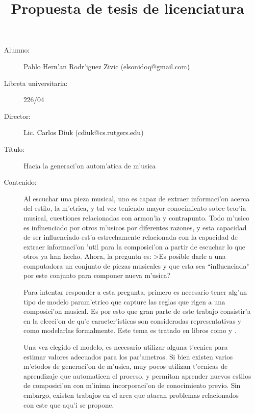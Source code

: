 \documentclass[a4paper,10pt]{article}
\title{Propuesta de tesis de licenciatura}
\begin{document}

\maketitle
 \begin{description}
  \item[Alumno:] Pablo Hern'an Rodr'iguez Zivic (elsonidoq@gmail.com)
  \item[Libreta universitaria:] 226/04
  \item[Director:] Lic. Carlos Diuk (cdiuk@cs.rutgers.edu)
  \item[T\'itulo:] Hacia la generaci'on autom'atica de m'usica
  \item[Contenido:] Al escuchar una pieza musical, uno es capaz de extraer informaci'on acerca del 
	estilo, la m'etrica, y tal vez teniendo mayor conocimiento sobre teor'ia musical, cuestiones relacionadas 
	con armon'ia y contrapunto. Todo m'usico es influenciado por otros m'usicos por diferentes razones, 
	y esta capacidad de ser influenciado est'a estrechamente relacionada con la capacidad de extraer 
	informaci'on 'util para la composici'on a partir de escuchar lo que otros ya han hecho.
	Ahora, la pregunta es: >Es posible darle a una computadora un conjunto de piezas musicales y que esta sea 
	``influenciada'' por este conjunto para componer nueva m'usica?
    
    Para intentar responder a esta pregunta, primero es necesario tener alg'un
    tipo de modelo param'etrico que capture las reglas que rigen a una composici'on musical.
    Es por esto que gran parte de este trabajo consistir'a en la elecci'on de qu'e 
    caracter'isticas son consideradas representativas y como modelarlas formalmente. 
    Este tema es tratado en libros como \cite{Musimathics} y \cite{MuPr}.
    
    Una vez elegido el modelo, es necesario utilizar alguna t'ecnica para
    estimar valores adecuados para los par'ametros. Si bien existen varios m'etodos de 
    generaci'on de m'usica, muy pocos utilizan t'ecnicas de aprendizaje 
	que automaticen el proceso, y permitan aprender nuevos estilos de composici'on con m'inima
	incorporaci'on de conocimiento previo. Sin embargo, existen trabajos en el
    area que atacan problemas relacionados con este que aqu'i se propone. 


\end{description}
\end{document}
